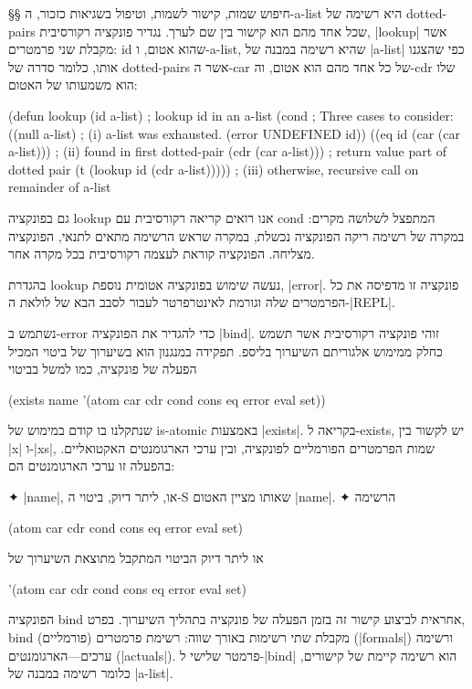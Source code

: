 §§ חיפוש שמות, קישור לשמות, וטיפול בשגיאות
כזכור, ה-a-list היא רשימה של dotted-pairs שכל אחד מהם הוא קישור בין שם לערך.
נגדיר פונקציה רקורסיבית, \E|lookup| אשר מקבלת שני פרמטרים: id שהוא אטום,
ו-a-list, שהיא רשימה במבנה של \E|a-list| כפי שהצגנו אותו, כלומר סדרה של
dotted-pairs אשר ה-car של כל אחד מהם הוא אטום, וה-cdr שלו הוא משמעותו של האטום:
\begin{KERNEL}
(defun lookup (id a-list) ; lookup id in an a-list
  (cond ; Three cases to consider:
    ((null a-list) ; (i) a-list was exhausted.
      (error UNDEFINED id))
    ((eq id (car (car a-list))) ; (ii) found in first dotted-pair
      (cdr (car a-list))) ; return value part of dotted pair
    (t (lookup id (cdr a-list))))) ; (iii) otherwise, recursive call on remainder of a-list
\end{KERNEL}
גם בפונקציה lookup אנו רואים קריאה רקורסיבית עם cond המתפצל לשלושה מקרים: במקרה
של רשימה ריקה הפונקציה נכשלת, במקרה שראש הרשימה מתאים לתנאי, הפונקציה מצליחה.
הפונקציה קוראת לעצמה רקורסיבית בכל מקרה אחר.

בהגדרת lookup נעשה שימוש בפונקציה אטומית נוספת, \E|error|. פונקציה זו
מדפיסה את כל הפרמטרים שלה וגורמת לאינטרפרטר לעבור לסבב הבא של לולאת ה-\E|REPL|.

נשתמש ב-error כדי להגדיר את הפונקציה \E|bind|. זוהי פונקציה רקורסיבית אשר תשמש כחלק
ממימוש אלגוריתם השיערוך בליספ. תפקידה במנגנון הוא בשיערוך של ביטוי המכיל הפעלה
של פונקציה, כמו למשל בביטוי
\begin{LISP}
  (exists name '(atom car cdr cond cons eq error eval set))
\end{LISP}
שנתקלנו בו קודם במימוש של is-atomic באמצעות \E|exists|. בקריאה ל-exists,
יש לקשור בין \E|x| ו-\E|xs|, שמות הפרמטרים הפורמליים לפונקציה, ובין ערכי
הארגומנטים האקטואליים. בהפעלה זו ערכי הארגומנטים הם:
\begin{itemize}
  ✦ \E|name|, או, ליתר דיוק, ביטוי ה-S שאותו מציין האטום \E|name|.
  ✦ הרשימה
  \begin{LISP}
    (atom car cdr cond cons eq error eval set)
  \end{LISP}
  או ליתר דיוק הביטוי המתקבל מתוצאת השיערוך של
  \begin{LISP}
  '(atom car cdr cond cons eq error eval set)
  \end{LISP}
\end{itemize}

הפונקציה bind אחראית לביצוע קישור זה בזמן הפעלה של פונקציה בתהליך השיערוך.
בפרט, bind מקבלת שתי רשימות באורך שווה: רשימת פרמטרים (פורמליים) (\E|formals|)
ורשימה ערכים---הארגומנטים (\E|actuals|). פרמטר שלישי ל-\E|bind| הוא רשימה קיימת
של קישורים, כלומר רשימה במבנה של \E|a-list|.

